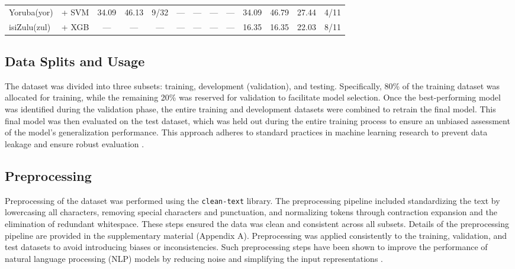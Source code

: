 \begin{table*}[h]
{\begin{tabular}{l|c|ccc|cccc|cccc}
            Yoruba(yor)                             & \citep{wang2024multilingual}     + SVM                                                       & 34.09                        & 46.13                        & 9/32                        & —             & —             & —                 & —             & 34.09         & 46.79         & 27.44             & 4/11          \\
            isiZulu(zul)                            & \citep{wang2024multilingual}     + XGB                                                       & —                            & —                            & —                           & —             & —             & —                 & —             & 16.35         & 16.35         & 22.03             & 8/11          \\
            \hline
        \end{tabular}
    }
\end{table*}


\subsection{Data Splits and Usage}
The dataset\cite{muhammad2025brighterbridginggaphumanannotated} was divided into three subsets: training, development (validation), and testing. Specifically, 80\% of the training dataset was allocated for training, while the remaining 20\% was reserved for validation to facilitate model selection. Once the best-performing model was identified during the validation phase, the entire training and development datasets were combined to retrain the final model. This final model was then evaluated on the test dataset, which was held out during the entire training process to ensure an unbiased assessment of the model's generalization performance. This approach adheres to standard practices in machine learning research to prevent data leakage and ensure robust evaluation \citep{Goodfellow-et-al-2016}.

\subsection{Preprocessing}

Preprocessing of the dataset was performed using the \texttt{clean-text} library. The preprocessing pipeline included standardizing the text by lowercasing all characters, removing special characters and punctuation, and normalizing tokens through contraction expansion and the elimination of redundant whitespace. These steps ensured the data was clean and consistent across all subsets. Details of the preprocessing pipeline are provided in the supplementary material (Appendix A). Preprocessing was applied consistently to the training, validation, and test datasets to avoid introducing biases or inconsistencies. Such preprocessing steps have been shown to improve the performance of natural language processing (NLP) models by reducing noise and simplifying the input representations \citep{Zhang2020DataPrep}.

